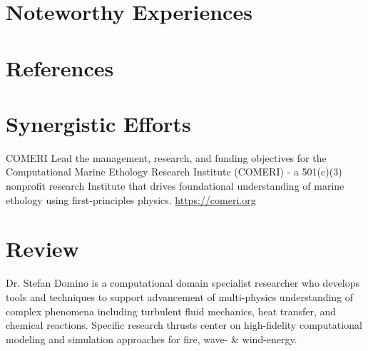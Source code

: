 \documentclass[letterpaper]{twentysecondcv_spd} %
\begin{document}
\section{Noteworthy Experiences}

\begin{twentyshort} %
\end{twentyshort}

\section{References}

\begin{twentysingle} %
\end{twentysingle}

\section{Synergistic Efforts}

\begin{twenty} %

	 {COMERI} {Lead the management, research, and funding objectives
    for the Computational Marine Ethology Research Institute (COMERI) - a 501(c)(3) nonprofit research Institute that drives 
    foundational understanding of marine ethology using first-principles physics. \underline{https://comeri.org}}

\end{twenty}

\section{Review}

Dr. Stefan Domino is a computational domain specialist researcher who develops tools and techniques
to support advancement of multi-physics understanding of complex phenomena including turbulent 
fluid mechanics, heat transfer, and chemical reactions. Specific research thrusts center on high-fidelity
computational modeling and simulation approaches for fire, wave- \& wind-energy.
\end{document}
